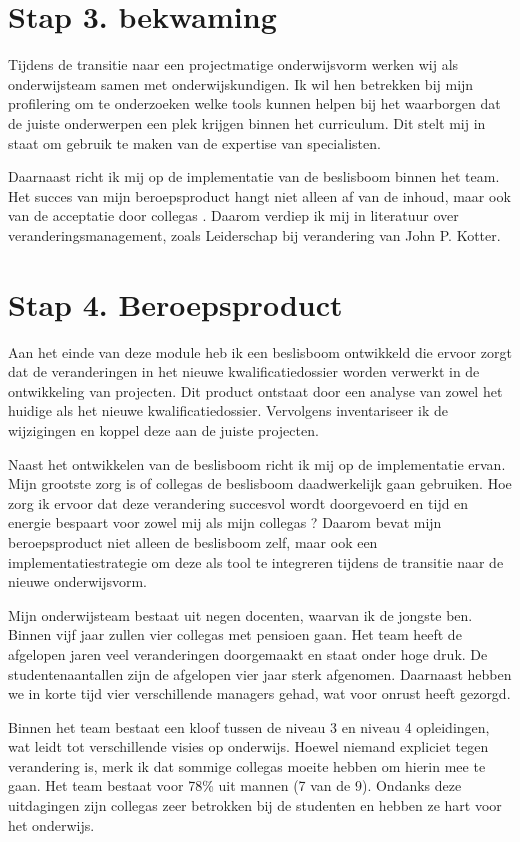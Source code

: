 \section{Stap 3. bekwaming}
Tijdens de transitie naar een projectmatige onderwijsvorm werken wij als onderwijsteam samen met onderwijskundigen. Ik wil hen betrekken bij mijn profilering om te onderzoeken welke tools kunnen helpen bij het waarborgen dat de juiste onderwerpen een plek krijgen binnen het curriculum. Dit stelt mij in staat om gebruik te maken van de expertise van specialisten.

Daarnaast richt ik mij op de implementatie van de beslisboom binnen het team. Het succes van mijn beroepsproduct hangt niet alleen af van de inhoud, maar ook van de acceptatie door collega\textquotesingle s
. Daarom verdiep ik mij in literatuur over veranderingsmanagement, zoals Leiderschap bij verandering van John P. Kotter.

\section{Stap 4. Beroepsproduct}
Aan het einde van deze module heb ik een beslisboom ontwikkeld die ervoor zorgt dat de veranderingen in het nieuwe kwalificatiedossier worden verwerkt in de ontwikkeling van projecten. Dit product ontstaat door een analyse van zowel het huidige als het nieuwe kwalificatiedossier. Vervolgens inventariseer ik de wijzigingen en koppel deze aan de juiste projecten.

Naast het ontwikkelen van de beslisboom richt ik mij op de implementatie ervan. Mijn grootste zorg is of collega\textquotesingle s
de beslisboom daadwerkelijk gaan gebruiken. Hoe zorg ik ervoor dat deze verandering succesvol wordt doorgevoerd en tijd en energie bespaart voor zowel mij als mijn collega\textquotesingle s
? Daarom bevat mijn beroepsproduct niet alleen de beslisboom zelf, maar ook een implementatiestrategie om deze als tool te integreren tijdens de transitie naar de nieuwe onderwijsvorm.

Mijn onderwijsteam bestaat uit negen docenten, waarvan ik de jongste ben. Binnen vijf jaar zullen vier collega\textquotesingle s
 met pensioen gaan. Het team heeft de afgelopen jaren veel veranderingen doorgemaakt en staat onder hoge druk. De studentenaantallen zijn de afgelopen vier jaar sterk afgenomen. Daarnaast hebben we in korte tijd vier verschillende managers gehad, wat voor onrust heeft gezorgd.

Binnen het team bestaat een kloof tussen de niveau 3 en niveau 4 opleidingen, wat leidt tot verschillende visies op onderwijs. Hoewel niemand expliciet tegen verandering is, merk ik dat sommige collega\textquotesingle s
 moeite hebben om hierin mee te gaan. Het team bestaat voor 78\% uit mannen (7 van de 9). Ondanks deze uitdagingen zijn collega\textquotesingle s
 zeer betrokken bij de studenten en hebben ze hart voor het onderwijs.

